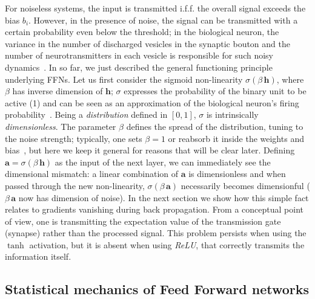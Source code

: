 \documentclass{article}
\begin{document}
For noiseless systems, the input is transmitted i.f.f. the overall signal exceeds the bias $b_i$. However, in the presence of noise, the signal can be transmitted with a certain probability even below the threshold; in the biological neuron, the variance in the number of discharged vesicles in the synaptic bouton and the number of neurotransmitters in each vesicle is responsible for such noisy dynamics~\cite{amit1}. In so far, we just described the general functioning principle underlying FFNs. Let us first consider the sigmoid non-linearity $\sigma(\beta \, \mathbf{h} )$, where $\beta$  has inverse dimension of $\mathbf{h}$;  $\sigma$ expresses the probability of the binary unit to be active (1) and can be seen as an approximation of the biological neuron's firing probability~\cite{amit1}. Being a {\it distribution} defined in $[0,1]$, $\sigma$ is intrinsically {\it dimensionless}. The parameter $\beta$ defines the spread of the distribution, tuning to the noise strength; typically, one sets $\beta =1$ or reabsorb it inside the weights and bias~\cite{zecchina}, but here we keep it general for reasons that will be clear later. Defining $\mathbf{a} = \sigma(\beta \, \mathbf{h} )$ as the input of the next layer, we can immediately see the dimensional mismatch: a linear combination of $\mathbf{a}$ is dimensionless and when passed through the new non-linearity, $\sigma(\beta \, \mathbf{a} )$ necessarily becomes dimensionful ($\beta \, \mathbf{a}$ now has dimension of noise). In the next section we show how this simple fact relates to gradients vanishing during back propagation. From a conceptual point of view, one is transmitting the expectation value of the transmission gate (synapse) rather than the processed signal. This problem persists when using the $\tanh$ activation, but it is absent when using {\it ReLU}, that correctly transmits the information itself.

\subsection{Statistical mechanics of Feed Forward networks}
\end{document}
